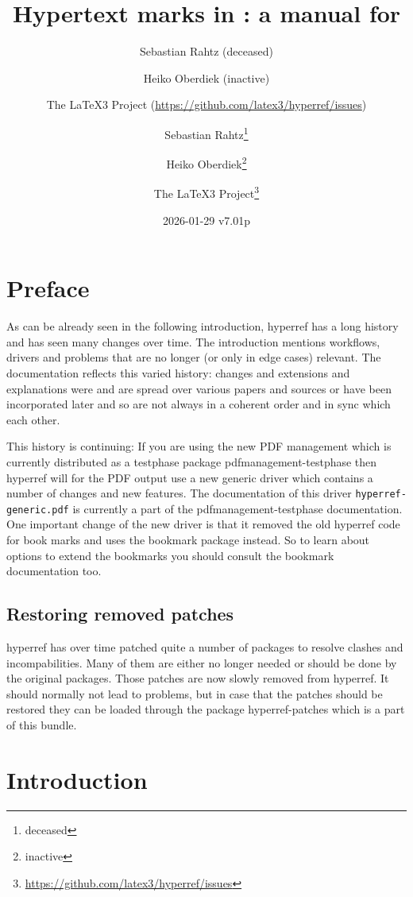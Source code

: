 \documentclass{article}
\author{Sebastian Rahtz (deceased)\and
       Heiko Oberdiek (inactive)\and
       The \LaTeX3 Project (\url{https://github.com/latex3/hyperref/issues})}
\author{Sebastian Rahtz\thanks{deceased}\and
       Heiko Oberdiek\thanks{inactive}\and
       The \LaTeX3 Project\thanks{\url{https://github.com/latex3/hyperref/issues}}}
\title{Hypertext marks in \hologo{LaTeX}: a manual for \xpackage{hyperref}}
\date{2026-01-29 v7.01p}
\newcommand*{\xpackage}[1]{\textsf{#1}}
\begin{document}
\thispagestyle{empty}
\maketitle
\tableofcontents
\setcounter{tocdepth}{2}%

\section{Preface}
As can be already seen in the following introduction, \xpackage{hyperref}
has a long history and has seen many changes over time. The introduction
mentions workflows, drivers and problems that are no longer (or only in edge cases) relevant.
The documentation reflects this varied history: changes
and extensions and explanations were and are spread over various papers and sources or
have been incorporated later and so are not always in a coherent order and in sync which each other.

This history is continuing: If you are using the new  PDF management
which is currently distributed as a testphase package \xpackage{pdfmanagement-testphase}
then \xpackage{hyperref} will for the PDF output use a new generic driver which
contains a number of changes and new features. The documentation of this driver
\texttt{hyperref-generic.pdf}
is currently a part of the \xpackage{pdfmanagement-testphase} documentation.
One important change of the new driver is
that it removed the old \xpackage{hyperref} code for book marks and uses
the \xpackage{bookmark} package instead. So to learn
about options to extend the bookmarks you should consult the \xpackage{bookmark} documentation
too.

\subsection{Restoring removed patches}

\xpackage{hyperref} has over time patched quite a number of packages to resolve clashes and incompabilities.
Many of them are either no longer needed or should be done by the original packages.
Those patches are now slowly removed from \xpackage{hyperref}.  It should normally not lead to problems, but
in case that the patches should be restored they can be loaded through the package \xpackage{hyperref-patches} which
is a part of this bundle.



\section{Introduction}
\end{document}
